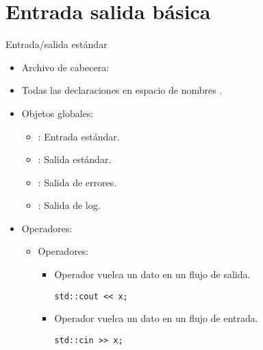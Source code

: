 \section{Entrada salida básica}

\begin{frame}[fragile]{Entrada/salida estándar}
\begin{itemize}
  \item Archivo de cabecera: 
  \item Todas las declaraciones en espacio de nombres .
  \item Objetos globales:
    \begin{itemize}
      \item {}: Entrada estándar.
      \item {}: Salida estándar.
      \item {}: Salida de errores.
      \item {}: Salida de log.
    \end{itemize}
  \item Operadores:
    \begin{itemize}
      \item Operadores:
        \begin{itemize}
          \item Operador \cppid{<{}<} vuelca un dato en un flujo de salida.
\begin{lstlisting}
std::cout << x;
\end{lstlisting}
          \item Operador \cppid{>>} vuelca un dato en un flujo de entrada.
\begin{lstlisting}
std::cin >> x;
\end{lstlisting}
        \end{itemize}
    \end{itemize}
\end{itemize}
\end{frame}


